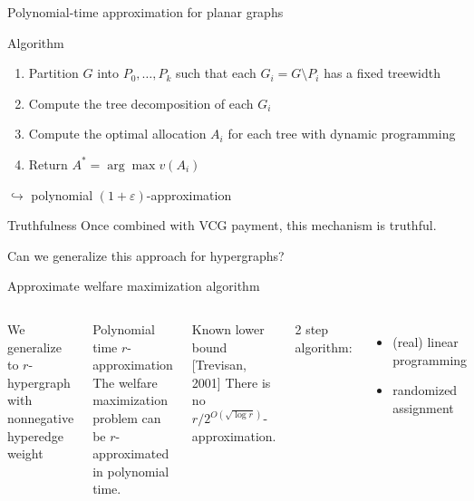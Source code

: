 \documentclass[aspectratio=169]{beamer}
\begin{document}
\begin{frame}{Polynomial-time approximation for planar graphs}
    \begin{block}{Algorithm}
        \begin{enumerate}
            \item \alert{Partition} $G$ into $P_0, \dots, P_k$ such that each $G_i = G \setminus P_i$ has a \alert{fixed treewidth}
            \item Compute the \alert{tree decomposition} of each $G_i$
            \item Compute the optimal allocation $A_i$ for each tree with \alert{dynamic programming}
            \item Return $A^* = \arg \max v(A_i)$
        \end{enumerate}
    \end{block}

    $\hookrightarrow$ polynomial $(1 + \varepsilon)$-approximation

    \begin{block}{Truthfulness}
        Once combined with \alert{VCG payment}, this mechanism is \alert{truthful}.
    \end{block}
\end{frame}

\begin{frame}[standout]
    Can we generalize this approach for \alert{hypergraphs}?
\end{frame}

\begin{frame}{Approximate welfare maximization algorithm}
    \begin{columns}
        We generalize to \(r\)-hypergraph with \alert{nonnegative hyperedge weight}

        \begin{block}{Polynomial time \(r\)-approximation}
            The welfare maximization problem can be \(r\)-approximated in polynomial time.
        \end{block}

        \begin{block}{Known lower bound [Trevisan, 2001]}
            There is no \(r/2^{O(\sqrt{\log r})}\)-approximation.
        \end{block}

        2 step algorithm:
        \begin{itemize}
            \item (real) linear programming
            \item randomized assignment
        \end{itemize}
    \end{columns}
\end{frame}
\end{document}

